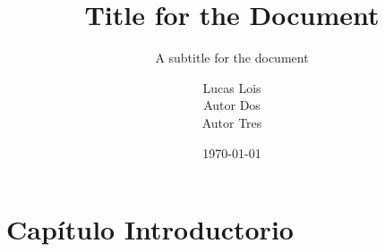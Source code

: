 \documentclass[12pt]{report}
\title{Title for the Document}
\subtitle{A subtitle for the document}
\institute{Universidad Católica del Uruguay}
\author{
	Lucas Lois\\
	Autor Dos\\
	Autor Tres
}
\date{\today}
\begin{document}

\tableofcontents
\chapter{Capítulo Introductorio}

\blindtext \parencite{coulouris}

\pagebreak
\printbibliography{}
\end{document}

